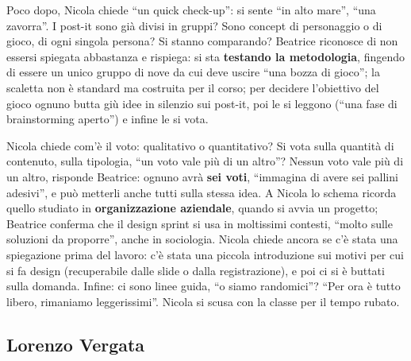 Poco dopo, Nicola chiede ``un quick check-up'': si sente ``in alto mare'', ``una
zavorra''. I post-it sono già divisi in gruppi? Sono concept di personaggio o di
gioco, di ogni singola persona? Si stanno comparando? Beatrice riconosce di non
essersi spiegata abbastanza e rispiega: si sta \textbf{testando la metodologia},
fingendo di essere un unico gruppo di nove da cui deve uscire ``una bozza di gioco'';
la scaletta non è standard ma costruita per il corso; per decidere l'obiettivo del
gioco ognuno butta giù idee in silenzio sui post-it, poi le si leggono (``una fase di
brainstorming aperto'') e infine le si vota.

Nicola chiede com'è il voto: qualitativo o quantitativo? Si vota sulla quantità di
contenuto, sulla tipologia, ``un voto vale più di un altro''? Nessun voto vale più di
un altro, risponde Beatrice: ognuno avrà \textbf{sei voti}, ``immagina di avere sei
pallini adesivi'', e può metterli anche tutti sulla stessa idea. A Nicola lo schema
ricorda quello studiato in \textbf{organizzazione aziendale}, quando si avvia un
progetto; Beatrice conferma che il design sprint si usa in moltissimi contesti, ``molto
sulle soluzioni da proporre'', anche in sociologia. Nicola chiede ancora se c'è stata
una spiegazione prima del lavoro: c'è stata una piccola introduzione sui motivi per cui
si fa design (recuperabile dalle slide o dalla registrazione), e poi ci si è buttati
sulla domanda. Infine: ci sono linee guida, ``o siamo randomici''? ``Per ora è tutto
libero, rimaniamo leggerissimi''. Nicola si scusa con la classe per il tempo rubato.

\subsection{Lorenzo Vergata}
\label{a7:sec:idee-vergata}

